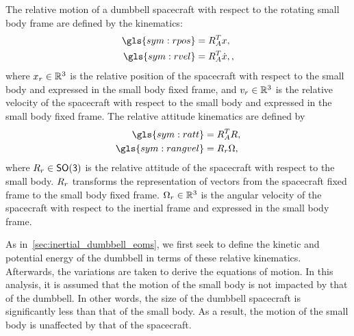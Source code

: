 The relative motion of a dumbbell spacecraft with respect to the rotating small body frame are defined by the kinematics:
\begin{align}
    \gls{sym:rpos} &= R_A^T \vc{x}, \label{eq:relative_position} \\
    \gls{sym:rvel} &= R_A^T \dot{\vc{x}}, \label{eq:relative_velocity},
\end{align}
where \( x_r \in \mathbb{R}^3 \) is the relative position of the spacecraft with respect to the small body and expressed in the small body fixed frame, and \( v_r \in \mathbb{R}^3 \) is the relative velocity of the spacecraft with respect to the small body and expressed in the small body fixed frame.
The relative attitude kinematics are defined by
\begin{align}
    \gls{sym:ratt} &= R_A^T R, \label{eq:relative_attitude} \\
    \gls{sym:rangvel} &= \ratt  \vc{\Omega}, \label{eq:relative_angular_velocity}
\end{align}
where \( R_r \in \mathsf{SO(3)} \) is the relative attitude of the spacecraft with respect to the small body.
\( R_r \) transforms the representation of vectors from the spacecraft fixed frame to the small body fixed frame.
\( \Omega_r \in \mathbb{R}^3 \) is the angular velocity of the spacecraft with respect to the inertial frame and expressed in the small body frame.

As in~\cref{sec:inertial_dumbbell_eoms}, we first seek to define the kinetic and potential energy of the dumbbell in terms of these relative kinematics. 
Afterwards, the variations are taken to derive the equations of motion.
In this analysis, it is assumed that the motion of the small body is not impacted by that of the dumbbell.
In other words, the size of the dumbbell spacecraft is significantly less than that of the small body. 
As a result, the motion of the small body is unaffected by that of the spacecraft.

